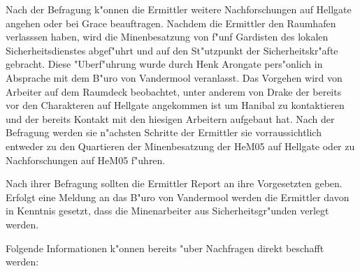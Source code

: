 
Nach der Befragung k"onnen die Ermittler weitere Nachforschungen auf Hellgate angehen oder bei Grace beauftragen. Nachdem die Ermittler den Raumhafen verlasssen haben, wird die Minenbesatzung von f"unf Gardisten des lokalen Sicherheitsdienstes abgef"uhrt und auf den St"utzpunkt der Sicherheitskr"afte gebracht. Diese "Uberf"uhrung wurde durch Henk Arongate pers"onlich in Absprache mit dem B"uro von Vandermool veranlasst. Das Vorgehen wird von Arbeiter auf dem Raumdeck beobachtet, unter anderem von Drake der bereits vor den Charakteren auf Hellgate angekommen ist um Hanibal zu kontaktieren und der bereits Kontakt mit den hiesigen Arbeitern aufgebaut hat. Nach der Befragung werden sie n"achsten Schritte der Ermittler sie vorraussichtlich entweder zu den Quartieren der Minenbesatzung der HeM05 auf Hellgate oder zu Nachforschungen auf HeM05 f"uhren. 

Nach ihrer Befragung sollten die Ermittler Report an ihre Vorgesetzten geben. Erfolgt eine Meldung an das B"uro von Vandermool werden die Ermittler davon in Kenntnis gesetzt, dass die Minenarbeiter aus Sicherheitsgr"unden verlegt werden.

Folgende Informationen k"onnen bereits "uber Nachfragen direkt beschafft werden:

